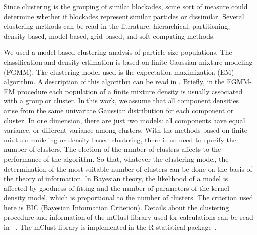 \documentclass[journal=langd5,manuscript=article]{achemso}
\begin{document}
Since clustering is the grouping of similar blockades, some sort of measure could determine whether if blockades represent similar particles or dissimilar. Several  clustering methods can be read in the literature:  hierarchical,  partitioning,  density-based,  model-based,  grid-based, and  soft-computing  methods\cite{Rokach2005}.

We used a model-based clustering analysis of particle size populations. The classification and density estimation is based on finite Gaussian mixture modeling (FGMM). The clustering model used is the expectation-maximization (EM) algorithm. A description  of this algorithm can be read in \citeauthor{Do2008} 
\cite{Do2008}. Briefly, in the FGMM-EM procedure each population of a finite  mixture density is usually associated with a group or cluster. In this work, we assume that all component densities arise from the same univariate Gaussian distribution for each component or cluster. In one dimension, there are just two models: all components have equal variance, or different variance among clusters.
With the methods based on finite mixture modeling or density-based clustering, there is no need to specify the number of clusters. The election of the number of clusters affects to the performance of the algorithm. So that, whatever the clustering model, the
determination of the most suitable number of clusters can be done on the basis of the theory of information. In Bayesian
theory, the likelihood of a model is affected by goodness-of-fitting and the number of parameters of the kernel density model, which is proportional to the number of clusters. The criterion used here is BIC (Bayesian Information Criterion).
Details about the clustering procedure and information of the mClust library used for calculations can be read in
~\citeauthor{Fraley2012mClustEstimation}\cite{Fraley2012mClustEstimation}. The mClust library is implemented in the R statistical package~\cite{RCoreTeam2011}.





\end{document}
